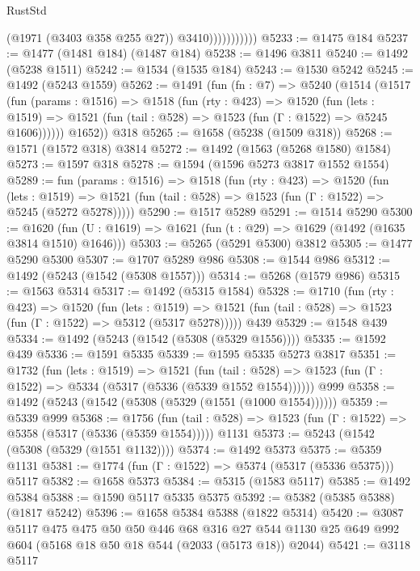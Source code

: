 \begin{lexlean}{RustStd}
\begin{coremodule}
                          (@1971 (@3403 @358 @255 @27))
                          @3410)))))))))))
@5233 := @1475 @184
@5237 := @1477 (@1481 @184) (@1487 @184)
@5238 := @1496 @3811
@5240 := @1492 (@5238 @1511)
@5242 := @1534 (@1535 @184)
@5243 := @1530 @5242
@5245 := @1492 (@5243 @1559)
@5262 := @1491
    (fun (fn : @7) =>
    @5240
      (@1514
        (@1517
          (fun (params : @1516) =>
          @1518
            (fun (rty : @423) =>
            @1520
              (fun (lets : @1519) =>
              @1521 (fun (tail : @528) => @1523 (fun (Γ : @1522) => @5245 @1606))))))
        @1652))
    @318
@5265 := @1658 (@5238 (@1509 @318))
@5268 := @1571 (@1572 @318) @3814
@5272 := @1492 (@1563 (@5268 @1580) @1584)
@5273 := @1597 @318
@5278 := @1594 (@1596 @5273 @3817 @1552 @1554)
@5289 := fun (params : @1516) =>
  @1518
    (fun (rty : @423) =>
    @1520
      (fun (lets : @1519) =>
      @1521 (fun (tail : @528) => @1523 (fun (Γ : @1522) => @5245 (@5272 @5278)))))
@5290 := @1517 @5289
@5291 := @1514 @5290
@5300 := @1620 (fun (U : @1619) => @1621 (fun (t : @29) => @1629 (@1492 (@1635 @3814 @1510) @1646)))
@5303 := @5265 (@5291 @5300) @3812
@5305 := @1477 @5290 @5300
@5307 := @1707 @5289 @986
@5308 := @1544 @986
@5312 := @1492 (@5243 (@1542 (@5308 @1557)))
@5314 := @5268 (@1579 @986)
@5315 := @1563 @5314
@5317 := @1492 (@5315 @1584)
@5328 := @1710
    (fun (rty : @423) =>
    @1520
      (fun (lets : @1519) =>
      @1521 (fun (tail : @528) => @1523 (fun (Γ : @1522) => @5312 (@5317 @5278)))))
    @439
@5329 := @1548 @439
@5334 := @1492 (@5243 (@1542 (@5308 (@5329 @1556))))
@5335 := @1592 @439
@5336 := @1591 @5335
@5339 := @1595 @5335 @5273 @3817
@5351 := @1732
    (fun (lets : @1519) =>
    @1521
      (fun (tail : @528) => @1523 (fun (Γ : @1522) => @5334 (@5317 (@5336 (@5339 @1552 @1554))))))
    @999
@5358 := @1492 (@5243 (@1542 (@5308 (@5329 (@1551 (@1000 @1554))))))
@5359 := @5339 @999
@5368 := @1756
    (fun (tail : @528) => @1523 (fun (Γ : @1522) => @5358 (@5317 (@5336 (@5359 @1554)))))
    @1131
@5373 := @5243 (@1542 (@5308 (@5329 (@1551 @1132))))
@5374 := @1492 @5373
@5375 := @5359 @1131
@5381 := @1774 (fun (Γ : @1522) => @5374 (@5317 (@5336 @5375))) @5117
@5382 := @1658 @5373
@5384 := @5315 (@1583 @5117)
@5385 := @1492 @5384
@5388 := @1590 @5117 @5335 @5375
@5392 := @5382 (@5385 @5388) (@1817 @5242)
@5396 := @1658 @5384 @5388 (@1822 @5314)
@5420 := @3087
    @5117
    @475
    @475
    @50
    @50
    @446
    @68
    @316
    @27
    @544
    @1130
    @25
    @649
    @992
    @604
    (@5168 @18 @50 @18 @544 (@2033 (@5173 @18)) @2044)
@5421 := @3118 @5117

\end{coremodule}
\end{lexlean}
